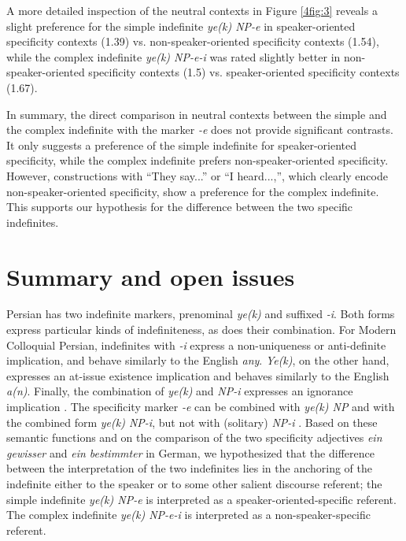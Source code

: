 \documentclass[output=paper]{langsci/langscibook}
\begin{document}
A more detailed inspection of the neutral contexts in Figure \ref{4fig:3} reveals a slight preference for the simple indefinite {\emph{ye(k) NP-e}} in speaker-oriented specificity contexts (1.39) vs. non-speaker-oriented specificity contexts (1.54), while the complex indefinite {\emph{ye(k) NP-e-i}} was rated slightly better in non-speaker-oriented specificity contexts (1.5) vs. speaker-oriented specificity contexts (1.67).

{
In summary, the direct comparison in neutral contexts between the simple and the complex indefinite with the marker {\emph{-e}} does not provide significant contrasts. It only suggests a preference of the simple indefinite for speaker-oriented specificity, while the complex indefinite prefers non-speaker-oriented specificity. However, constructions with ``They say...'' or ``I heard...,'', which clearly encode non-speaker-oriented specificity, show a preference for the complex indefinite. This supports our hypothesis for the difference between the two specific indefinites.
}

\section{Summary and open issues}\label{4sec:6}

{
Persian has two indefinite markers, prenominal {\emph{ye(k)}} and suffixed {\emph{-i}}. Both forms express particular kinds of indefiniteness, as does their combination. For Modern Colloquial Persian, indefinites with {\emph{-i}} express a non-uniqueness or anti-definite implication, and behave similarly to the English {\emph{any}}. {\emph{Ye(k)}}, on the other hand, expresses an at-issue existence implication and behaves similarly to the English {\emph{a(n)}}. Finally, the combination of {\emph{ye(k)}} and {\emph{NP-i}} expresses an ignorance implication \citep{jasbi:16}. The specificity marker {\emph{-e}} can be combined with {\emph{ye(k) NP}} and with the combined form {\emph{ye(k) NP-i}}, but not with (solitary) {\emph{NP-i}} \citep{windfuhr:79,ghomeshi:03}. Based on these semantic functions and on the comparison of the two specificity adjectives {\emph{ein gewisser}} and {\emph{ein bestimmter}} in German, we hypothesized that the difference between the interpretation of the two indefinites lies in the anchoring of the indefinite either to the speaker or to some other salient discourse referent; the simple indefinite {\emph{ye(k) NP-e}} is interpreted as a speaker-oriented-specific referent. The complex indefinite {\emph{ye(k) NP-e-i}} is interpreted as a non-speaker-specific referent. 
}
\end{document}
